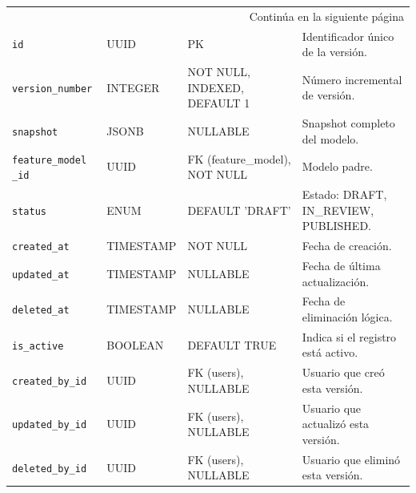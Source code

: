{{{\begin{longtable}{|p{}|p{}|p{}|p{}|}
                \hline
                \multicolumn{4}{|r|}{{Continúa en la siguiente página}} \\
                \endfoot
                
                \hline
                \endlastfoot
                
                \texttt{id} & UUID & PK & Identificador único de la versión. \\
                \hline
                \rowcolor[HTML]{EDEBF1}
                \texttt{version\_number} & INTEGER & NOT NULL, INDEXED, DEFAULT 1 & Número incremental de versión. \\
                \hline
                \texttt{snapshot} & JSONB & NULLABLE & Snapshot completo del modelo. \\
                \hline
                \rowcolor[HTML]{EDEBF1}
                \texttt{feature\_model 
                \_id} & UUID & FK (feature\_model), NOT NULL & Modelo padre. \\
                \hline
                \texttt{status} & ENUM & DEFAULT 'DRAFT' & Estado: DRAFT, IN\_REVIEW, PUBLISHED. \\
                \hline
                \rowcolor[HTML]{EDEBF1}
                \texttt{created\_at} & TIMESTAMP & NOT NULL & Fecha de creación. \\
                \hline
                \texttt{updated\_at} & TIMESTAMP & NULLABLE & Fecha de última actualización. \\
                \hline
                \rowcolor[HTML]{EDEBF1}
                \texttt{deleted\_at} & TIMESTAMP & NULLABLE & Fecha de eliminación lógica. \\
                \hline
                \texttt{is\_active} & BOOLEAN & DEFAULT TRUE & Indica si el registro está activo. \\
                \hline
                \rowcolor[HTML]{EDEBF1}
                \texttt{created\_by\_id} & UUID & FK (users), NULLABLE & Usuario que creó esta versión. \\
                \hline
                \texttt{updated\_by\_id} & UUID & FK (users), NULLABLE & Usuario que actualizó esta versión. \\
                \hline
                \rowcolor[HTML]{EDEBF1}
                \texttt{deleted\_by\_id} & UUID & FK (users), NULLABLE & Usuario que eliminó esta versión. \\
                \hline
            \end{longtable}

}}}
